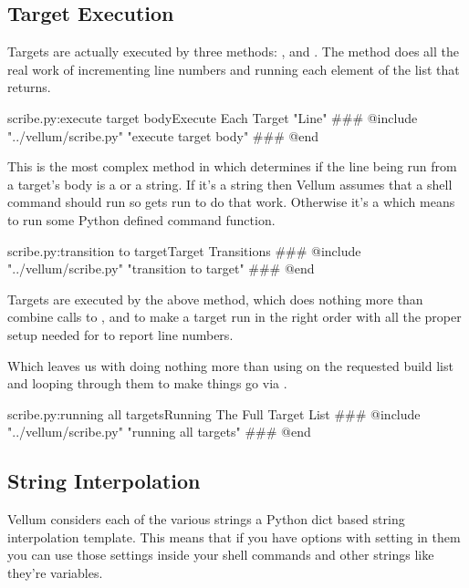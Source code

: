 \subsection{Target Execution}

Targets are actually executed by three methods: ,
 and .  The  method does
all the real work of incrementing line numbers and running each element of the
list that  returns.

\begin{code}{scribe.py:execute target body}{Execute Each Target "Line"}
### @include "../vellum/scribe.py" "execute target body"
### @end
\end{code}

This is the most complex method in  which determines if the line
being run from a target's body is a  or a string.  If it's a
string then Vellum assumes that a shell command should run so
 gets run to do that work.  Otherwise it's a
 which means to run some Python defined command function.


\begin{code}{scribe.py:transition to target}{Target Transitions}
### @include "../vellum/scribe.py" "transition to target"
### @end
\end{code}

Targets are executed by the above  method, which does nothing
more than combine calls to ,  and
 to make a target run in the right order with all the proper
setup needed for  to report line numbers.

Which leaves us with  doing nothing more than using
 on the requested build list and looping through
them to make things go via .

\begin{code}{scribe.py:running all targets}{Running The Full Target List}
### @include "../vellum/scribe.py" "running all targets"
### @end
\end{code}

\subsection{String Interpolation}

Vellum considers each of the various strings a Python dict based string
interpolation template.  This means that if you have options with setting in
them you can use those settings inside your shell commands and other strings
like they're variables.

